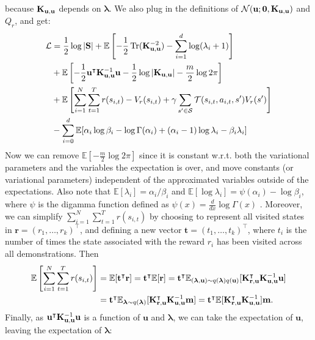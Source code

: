 \documentclass{mprop}
\theoremstyle{definition}
\DeclareMathOperator{\Tr}{Tr}
\begin{document}
because $\mathbf{K}_{\mathbf{u},\mathbf{u}}$ depends on $\bm\lambda$. We also plug in the definitions of
$\mathcal{N}(\mathbf{u}; \mathbf{0}, \mathbf{K}_{\mathbf{u},\mathbf{u}})$ and $Q_r$, and get:
\begin{align*}
  \mathcal{L} &= \frac{1}{2}\log|\mathbf{S}| + \mathbb{E}\left[-\frac{1}{2}\Tr(\Kuu^{-2}) - \sum_{i=1}^d \log(\lambda_i + 1)\right] \\
  &+ \mathbb{E}\left[-\frac{1}{2}\mathbf{u}^\intercal\Kuu^{-1}\mathbf{u} -
    \frac{1}{2}\log|\Kuu| - \frac{m}{2}\log 2\pi\right] \\
  &+ \mathbb{E}\left[\sum_{i=1}^N \sum_{t=1}^T r(s_{i,t}) - V_r(s_{i,t}) + \gamma\sum_{s' \in \mathcal{S}}
    \mathcal{T}(s_{i,t}, a_{i,t}, s')V_r(s') \right] \\
  &- \sum_{i=0}^d \mathbb{E}[\alpha_i\log\beta_i - \log\Gamma(\alpha_i) + (\alpha_i - 1)\log\lambda_i - \beta_i\lambda_i]
\end{align*}
Now we can remove $\mathbb{E}\left[-\frac{m}{2}\log2\pi\right]$ since it is
constant w.r.t. both the variational parameters and the variables the
expectation is over, and move constants (or variational parameters) independent
of the approximated variables outside of the expectations. Also note that
$\mathbb{E}[\lambda_i] = \alpha_i/\beta_i$ and
$\mathbb{E}[\log \lambda_i] = \psi(\alpha_i) - \log\beta_i$, where $\psi$ is the
digamma function defined as $\psi(x) = \frac{d}{dx}\log\Gamma(x)$
\cite{DBLP:books/lib/Bishop07}. Moreover, we can simplify
$\sum_{i=1}^N\sum_{t=1}^Tr(s_{i,t})$ by choosing to represent all visited states
in $\mathbf{r} = (r_1, \dots, r_k)^\intercal$, and defining a new vector
$\mathbf{t} = (t_1, \dots, t_k)^\intercal$, where $t_i$ is the number of times
the state associated with the reward $r_i$ has been visited across all
demonstrations. Then
\begin{align*}
\mathbb{E} \left[ \sum_{i=1}^N\sum_{t=1}^Tr(s_{i,t}) \right] &=
    \mathbb{E}[\mathbf{t}^\intercal\mathbf{r}] =
    \mathbf{t}^\intercal\mathbb{E}[\mathbf{r}] =
    \mathbf{t}^\intercal\mathbb{E}_{(\bm\lambda, \mathbf{u}) \sim
  q(\bm\lambda)q(\mathbf{u})}[\mathbf{K}_{\mathbf{r},\mathbf{u}}^\intercal\mathbf{K}_{\mathbf{u},\mathbf{u}}^{-1}\mathbf{u}] \\
  &= \mathbf{t}^\intercal\mathbb{E}_{\bm\lambda \sim q(\bm\lambda)}[\mathbf{K}_{\mathbf{r},\mathbf{u}}^\intercal\mathbf{K}_{\mathbf{u},\mathbf{u}}^{-1}\mathbf{m}] = \mathbf{t}^\intercal\mathbb{E}[\mathbf{K}_{\mathbf{r},\mathbf{u}}^\intercal\mathbf{K}_{\mathbf{u},\mathbf{u}}^{-1}]\mathbf{m}.
\end{align*}
Finally, as $\mathbf{u}^\intercal\mathbf{K}_{\mathbf{u},\mathbf{u}}^{-1}\mathbf{u}$ is a function of
$\mathbf{u}$ and $\bm\lambda$, we can take the expectation of $\mathbf{u}$, leaving
the expectation of $\bm\lambda$:
\end{document}
